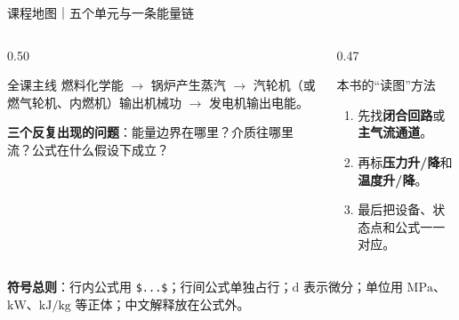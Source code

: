 \begin{frame}[t,shrink]{课程地图｜五个单元与一条能量链}
\begin{center}
\end{center}
\vspace{0.5mm}
\begin{columns}[T,onlytextwidth]
\begin{column}{0.50\textwidth}
  \begin{keybox}{全课主线}
  \small
  燃料化学能 $\rightarrow$ 锅炉产生蒸汽 $\rightarrow$ 汽轮机（或燃气轮机、内燃机）输出机械功 $\rightarrow$ 发电机输出电能。
  \par\vspace{1mm}
  \textbf{三个反复出现的问题}：能量边界在哪里？介质往哪里流？公式在什么假设下成立？
  \end{keybox}
\end{column}
\begin{column}{0.47\textwidth}
  \begin{bluebox}{本书的“读图”方法}
  \small
  \begin{enumerate}
    \item 先找\textbf{闭合回路}或\textbf{主气流通道}。
    \item 再标\textbf{压力升/降}和\textbf{温度升/降}。
    \item 最后把设备、状态点和公式一一对应。
  \end{enumerate}
  \end{bluebox}
\end{column}
\end{columns}
\vspace{1mm}
\begin{plainbox}
\small
\textbf{符号总则}：行内公式用 \texttt{\$...\$}；行间公式单独占行；\(\mathrm{d}\) 表示微分；单位用 \(\mathrm{MPa}\)、\(\mathrm{kW}\)、\(\mathrm{kJ/kg}\) 等正体；中文解释放在公式外。
\end{plainbox}
\end{frame}

